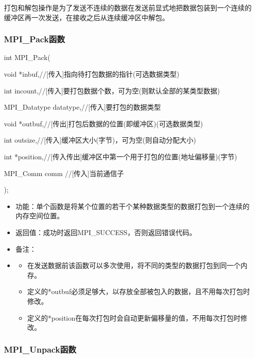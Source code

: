 \documentclass[UTF8]{article}%
\begin{document}
打包和解包操作是为了发送不连续的数据在发送前显式地把数据包装到一个连续的缓冲区再一次发送，在接收之后从连续缓冲区中解包。

\subsubsection{MPI\_Pack函数}

int MPI\_Pack(

    \qquad void            *inbuf,//[传入]指向待打包数据的指针(可选数据类型) 

    \qquad int             incount,//[传入]要打包数据个数，可为空(则默认全部的某类型数据)

    \qquad MPI\_Datatype   datatype,//[传入]要打包的数据类型

    \qquad void            *outbuf,//[传出]打包后数据的位置(即缓冲区)(可选数据类型)

    \qquad int             outsize,//[传入]缓冲区大小(字节)，可为空(则自动分配大小)

    \qquad int             *position,//[传入传出]缓冲区中第一个用于打包的位置(地址偏移量)(字节)

    \qquad MPI\_Comm       comm //[传入]当前通信子
    
);

\begin{itemize}
    \item 功能：单个函数是将某个位置的若干个某种数据类型的数据打包到一个连续的内存空间位置。
    \item 返回值：成功时返回MPI\_SUCCESS，否则返回错误代码。
    \item 备注：
    \item 
    {
        \begin{itemize}
            \item 在发送数据前该函数可以多次使用，将不同的类型的数据打包到同一个内存。
            \item 定义的*outbuf必须足够大，以存放全部被包入的数据，且不用每次打包时修改。
            \item 定义的*position在每次打包时会自动更新偏移量的值，不用每次打包时修改。
        \end{itemize}
    }

\end{itemize}


\subsubsection{MPI\_Unpack函数}
\end{document}
